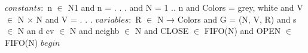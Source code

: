 \documentclass{book} %
\begin{document}
\begin{latin}
    
    \begin{algorithm}
        \begin{algorithmic}
            \STATE $constants:$
            \STATE n $\in$ N1 and n = . . . and N = 1 .. n and Colors = {grey, white} and
            \STATE V $\in$ N × N and V = {. . .}
            \STATE $variables:$
            \STATE R $\in$ N → Colors and G = (N, V, R) and
            \STATE s $\in$ N an d cv $\in$ N and neighb $\in$ N and CLOSE $\in$ FIFO(N) and OPEN $\in$ FIFO(N)
            \STATE $begin$



        \end{algorithmic}
    \end{algorithm}
        
\end{latin}
\end{document}

